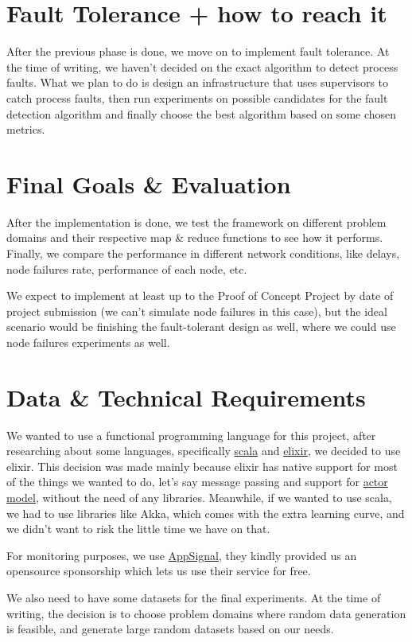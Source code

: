 \documentclass{article} %
\begin{document}
\section{Fault Tolerance + how to reach it}
After the previous phase is done, we move on to implement fault tolerance.
At the time of writing, we haven't decided on the exact algorithm to detect process faults. What we plan to do is design an infrastructure that uses supervisors to catch process faults, then run experiments on possible candidates for the fault detection algorithm and finally choose the best algorithm based on some chosen metrics.

\section{Final Goals \& Evaluation}
After the implementation is done, we test the framework on different problem domains and their respective map \& reduce functions to see how it performs. Finally, we compare the performance in different network conditions, like delays, node failures rate, performance of each node, etc.

We expect to implement at least up to the Proof of Concept Project by date of project submission (we can't simulate node failures in this case), but the ideal scenario would be finishing the fault-tolerant design as well, where we could use node failures experiments as well.

\section{Data \& Technical Requirements}

We wanted to use a functional programming language for this project, after researching about some languages, specifically \href{https://www.scala-lang.org}{scala} and \href{https://elixir-lang.org}{ elixir}, we decided to use elixir. This decision was made mainly because elixir has native support for most of the things we wanted to do, let's say message passing and support for \href{https://en.wikipedia.org/wiki/Actor_model}{actor model}, without the need of any libraries. Meanwhile, if we wanted to use scala, we had to use libraries like Akka, which comes with the extra learning curve, and we didn't want to risk the little time we have on that.

For monitoring purposes, we use \href{https://appsignal.com}{AppSignal}, they kindly provided us an opensource sponsorship which lets us use their service for free.

We also need to have some datasets for the final experiments. At the time of writing, the decision is to choose problem domains where random data generation is feasible, and generate large random datasets based on our needs.


\nocite{62}



\end{document}
